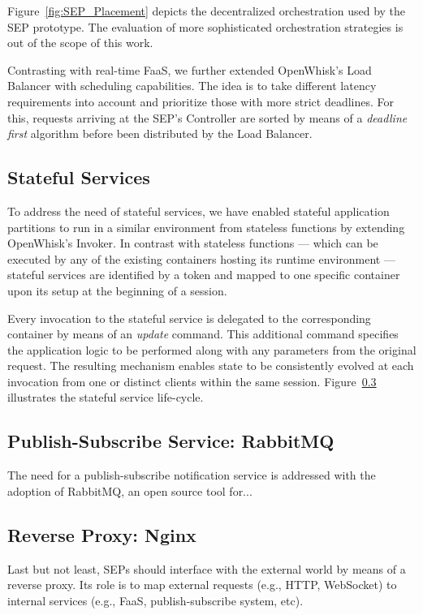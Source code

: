 Figure~\ref{fig:SEP_Placement} depicts the decentralized orchestration used by the SEP prototype. The evaluation of more sophisticated orchestration strategies is out of the scope of this work. 


Contrasting with real-time FaaS, we further extended OpenWhisk's Load Balancer with scheduling capabilities. The idea is to take different latency requirements into account and prioritize those with more strict deadlines. For this, requests arriving at the SEP's Controller are sorted by means of a \textit{deadline first} algorithm before been distributed by the Load Balancer.

\subsection{Stateful Services}

To address the need of stateful services, we have enabled stateful application partitions to run in a similar environment from stateless functions by extending OpenWhisk's Invoker. In contrast with stateless functions --- which can be executed by any of the existing containers hosting its runtime environment --- stateful services are identified by a token and mapped to one specific container upon its setup at the beginning of a session. 

Every invocation to the stateful service is delegated to the corresponding container by means of an \textit{update} command. This additional command specifies the application logic to be performed along with any parameters from the original request. The resulting mechanism enables state to be consistently evolved at each invocation from one or distinct clients within the same session. Figure~\ref{} illustrates the stateful service life-cycle.

\subsection{Publish-Subscribe Service: RabbitMQ}

The need for a publish-subscribe notification service is addressed with the adoption of RabbitMQ, an open source tool for...

\subsection{Reverse Proxy: Nginx}

Last but not least, SEPs should interface with the external world by means of a reverse proxy. Its role is to map external requests (e.g., HTTP, WebSocket) to internal services (e.g., FaaS, publish-subscribe system, etc). 

